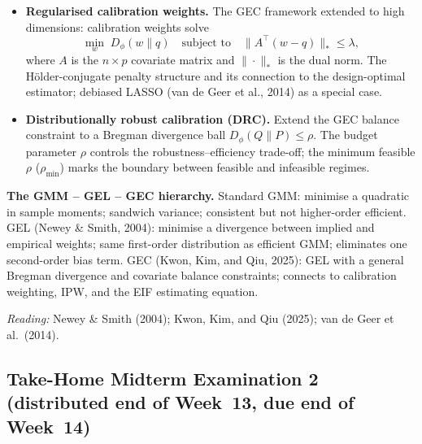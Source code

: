 \documentclass[12pt]{article}
\begin{document}
\begin{itemize}
  \item \textbf{Regularised calibration weights.}
    The GEC framework extended to high dimensions: calibration weights
    solve
    \[
      \min_w\; D_\phi(w \| q)
      \quad\text{subject to}\quad
      \bigl\|A^\top(w - q)\bigr\|_* \leq \lambda,
    \]
    where $A$ is the $n \times p$ covariate matrix and $\|\cdot\|_*$
    is the dual norm.  The H\"older-conjugate penalty structure and
    its connection to the design-optimal estimator; debiased LASSO
    (van de Geer et al., 2014) as a special case.

  \item \textbf{Distributionally robust calibration (DRC).}
    Extend the GEC balance constraint to a Bregman divergence
    ball $D_\phi(Q \| P) \leq \rho$.  The budget parameter $\rho$
    controls the robustness--efficiency trade-off; the minimum feasible
    $\rho$ ($\rho_{\min}$) marks the boundary between feasible and
    infeasible regimes.
\end{itemize}

\begin{keybox}
\noindent\textbf{The GMM -- GEL -- GEC hierarchy.}
Standard GMM: minimise a quadratic in sample moments; sandwich variance;
consistent but not higher-order efficient.
GEL (Newey \& Smith, 2004): minimise a divergence between implied and
empirical weights; same first-order distribution as efficient GMM;
eliminates one second-order bias term.
GEC (Kwon, Kim, and Qiu, 2025): GEL with a general Bregman divergence and
covariate balance constraints; connects to calibration weighting,
IPW, and the EIF estimating equation.
\end{keybox}

\noindent\textit{Reading:} Newey \& Smith (2004);
Kwon, Kim, and Qiu (2025);
van de Geer et al.\ (2014).

\subsection*{Take-Home Midterm Examination 2
  (distributed end of Week~13, due end of Week~14)}
\end{document}
